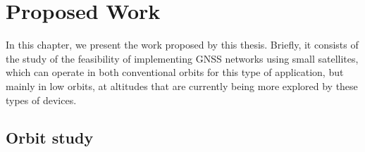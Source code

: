 %
%
%
%
%

%
%
%
%
%


\chapter{Proposed Work} \label{ch:proposed-work}


In this chapter, we present the work proposed by this thesis. Briefly, it consists of the study of the feasibility of implementing GNSS networks using small satellites, which can operate in both conventional orbits for this type of application, but mainly in low orbits, at altitudes that are currently being more explored by these types of devices.

\section{Orbit study}


